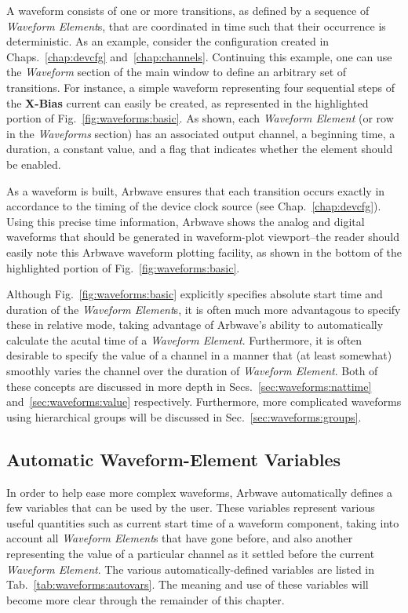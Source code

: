 A waveform consists of one or more transitions, as defined by a sequence of
\textit{Waveform Element}s, that are coordinated in time such that their
occurrence is deterministic.  As an example, consider the configuration created
in Chaps.~\ref{chap:devcfg} and~\ref{chap:channels}.  Continuing this example,
one can use the \textit{Waveform} section of the main window to define an
arbitrary set of transitions.  For instance, a simple waveform representing four
sequential steps of the \textbf{X-Bias} current can easily be created, as
represented in the highlighted portion of Fig.~\ref{fig:waveforms:basic}.  As
shown, each \textit{Waveform Element} (or row in the \textit{Waveforms} section)
has an associated output channel, a beginning time, a duration, a constant
value, and a flag that indicates whether the element should be enabled.

As a waveform is built, Arbwave ensures that each transition occurs exactly in
accordance to the timing of the device clock source (see
Chap.~\ref{chap:devcfg}).  Using this precise time information, Arbwave shows
the analog and digital waveforms that should be generated in waveform-plot
viewport--the reader should easily note this Arbwave waveform plotting facility,
as shown in the bottom of the highlighted portion of
Fig.~\ref{fig:waveforms:basic}.

Although Fig.~\ref{fig:waveforms:basic} explicitly specifies absolute start time
and duration of the \textit{Waveform Element}s, it is often much more
advantagous to specify these in relative mode, taking advantage of Arbwave's
ability to automatically calculate the acutal time of a \textit{Waveform
Element}.  Furthermore, it is often desirable to specify the value of a channel
in a manner that (at least somewhat) smoothly varies the channel over the
duration of \textit{Waveform Element}.  Both of these concepts are discussed in
more depth in Secs.~\ref{sec:waveforms:nattime} and~\ref{sec:waveforms:value}
respectively.  Furthermore, more complicated waveforms using hierarchical groups
will be discussed in Sec.~\ref{sec:waveforms:groups}.



\subsection{Automatic Waveform-Element Variables}

In order to help ease more complex waveforms, Arbwave automatically defines a
few variables that can be used by the user.  These variables represent various
useful quantities such as current start time of a waveform component, taking
into account all \textit{Waveform Element}s that have gone before, and also
another representing the value of a particular channel as it settled before the
current \textit{Waveform Element}.  The various automatically-defined variables
are listed in Tab.~\ref{tab:waveforms:autovars}.  The meaning and use of these
variables will become more clear through the remainder of this chapter.

